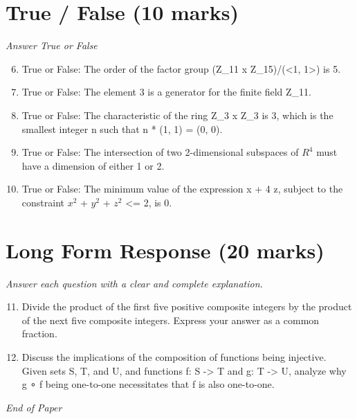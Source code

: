 \documentclass[12pt]{article}
\begin{document}
\section*{True / False (10 marks)}
\textit{Answer True or False}
\begin{enumerate}[label=\arabic*.]
\setcounter{enumi}{5}
\item True or False: The order of the factor group (Z\_11 x Z\_15)/(\textless{}1, 1\textgreater{}) is 5.
\item True or False: The element 3 is a generator for the finite field Z\_11.
\item True or False: The characteristic of the ring Z\_3 x Z\_3 is 3, which is the smallest integer n such that n * (1, 1) = (0, 0).
\item True or False: The intersection of two 2-dimensional subspaces of $R^4$ must have a dimension of either 1 or 2.
\item True or False: The minimum value of the expression x + 4 z, subject to the constraint $x^2$ + $y^2$ + $z^2$ \textless{}= 2, is 0.
\end{enumerate}

\section*{Long Form Response (20 marks)}
\textit{Answer each question with a clear and complete explanation.}
\begin{enumerate}[label=\arabic*.]
\setcounter{enumi}{10}
\item Divide the product of the first five positive composite integers by the product of the next five composite integers. Express your answer as a common fraction.
\item Discuss the implications of the composition of functions being injective. Given sets S, T, and U, and functions f: S -\textgreater{} T and g: T -\textgreater{} U, analyze why g ∘ f being one-to-one necessitates that f is also one-to-one.
\end{enumerate}

\vfill
\noindent\textit{End of Paper}
\end{document}
